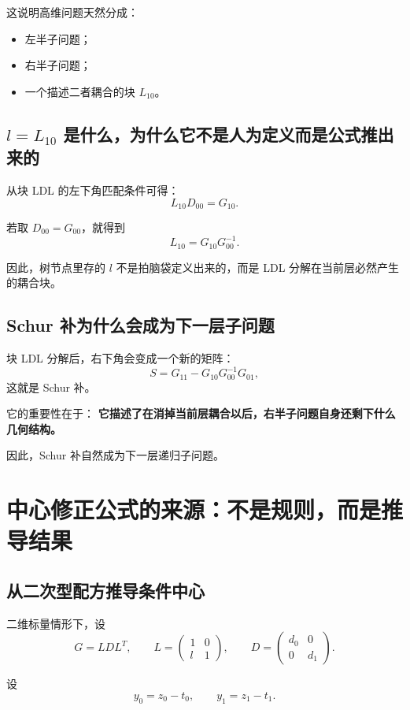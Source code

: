 \documentclass[11pt,a4paper]{ctexart}
\begin{document}
这说明高维问题天然分成：

\begin{itemize}
    \item 左半子问题；
    \item 右半子问题；
    \item 一个描述二者耦合的块 \(L_{10}\)。
\end{itemize}

\subsection{\(l=L_{10}\) 是什么，为什么它不是人为定义而是公式推出来的}

从块 LDL 的左下角匹配条件可得：
\[
L_{10}D_{00}=G_{10}.
\]

若取 \(D_{00}=G_{00}\)，就得到
\[
L_{10}=G_{10}G_{00}^{-1}.
\]

因此，树节点里存的 \(l\) 不是拍脑袋定义出来的，而是 LDL 分解在当前层必然产生的耦合块。

\subsection{Schur 补为什么会成为下一层子问题}

块 LDL 分解后，右下角会变成一个新的矩阵：
\[
S=G_{11}-G_{10}G_{00}^{-1}G_{01},
\]
这就是 Schur 补。

它的重要性在于：  
\textbf{它描述了在消掉当前层耦合以后，右半子问题自身还剩下什么几何结构。}

因此，Schur 补自然成为下一层递归子问题。

\section{中心修正公式的来源：不是规则，而是推导结果}

\subsection{从二次型配方推导条件中心}

二维标量情形下，设
\[
G=L D L^T,\qquad
L=
\begin{pmatrix}
1 & 0\\
l & 1
\end{pmatrix},
\qquad
D=
\begin{pmatrix}
d_0 & 0\\
0 & d_1
\end{pmatrix}.
\]

设
\[
y_0=z_0-t_0,\qquad y_1=z_1-t_1.
\]
\end{document}
